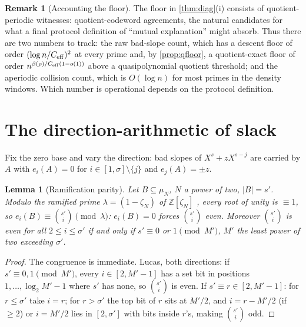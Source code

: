 \documentclass[11pt]{article}
\newtheorem{lemma}[lemma]{Lemma}
\theoremstyle{definition}
\newtheorem{remark}[remark]{Remark}
\newcommand{\Z}{\mathbb Z}
\newcommand{\ceff}{C_{\rm eff}}
\begin{document}
\begin{remark}[Accounting the floor]\label{rem:flooracct}
The floor in \cref{thm:diag}(i) consists of quotient-periodic witnesses: quotient-codeword agreements, the natural candidates for what a final protocol definition of ``mutual explanation'' might absorb.  Thus there are two numbers to track: the raw bad-slope count, which has a descent floor of order $(\log n/\ceff)^2$ at every prime and, by \cref{prop:qfloor}, a quotient-exact floor of order $n^{\beta(\rho)/\ceff(1-o(1))}$ above a quasipolynomial quotient threshold; and the aperiodic collision count, which is $O(\log n)$ for most primes in the density windows.  Which number is operational depends on the protocol definition.
\end{remark}

\section{The direction-arithmetic of slack}\label{sec:directions}

Fix the zero base and vary the direction: bad slopes of $X^s+zX^{s-j}$ are carried by $A$ with $e_i(A)=0$ for $i\in[1,\sigma]\setminus\{j\}$ and $e_j(A)=\pm z$.

\begin{lemma}[Ramification parity]\label{lem:parity}
Let $B\subseteq\mu_{N}$, $N$ a power of two, $|B|=s'$.  Modulo the ramified prime $\lambda=(1-\zeta_{N})$ of $\Z[\zeta_{N}]$ \cite{Was97}, every root of unity is $\equiv1$, so $e_i(B)\equiv\binom{s'}i\pmod\lambda$: $e_i(B)=0$ forces $\binom{s'}i$ even.  Moreover $\binom{s'}i$ is even for all $2\le i\le\sigma'$ if and only if $s'\equiv0$ or $1\pmod{M'}$, $M'$ the least power of two exceeding $\sigma'$.
\end{lemma}

\begin{proof}
The congruence is immediate.  Lucas, both directions: if $s'\equiv0,1\pmod{M'}$, every $i\in[2,M'-1]$ has a set bit in positions $1,\dots,\log_2M'-1$ where $s'$ has none, so $\binom{s'}i$ is even.  If $s'\equiv r\in[2,M'-1]$: for $r\le\sigma'$ take $i=r$; for $r>\sigma'$ the top bit of $r$ sits at $M'/2$, and $i=r-M'/2$ (if $\ge2$) or $i=M'/2$ lies in $[2,\sigma']$ with bits inside $r$'s, making $\binom{s'}i$ odd.
\end{proof}
\end{document}
